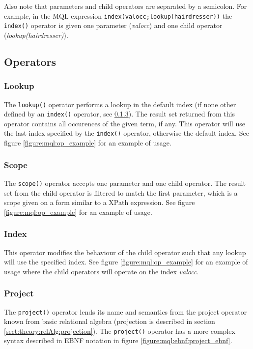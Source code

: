 Also note that parameters and child operators are separated by a semicolon. For
example, in the MQL expression \texttt{index(valocc;lookup(hairdresser))} the
\texttt{index()} operator is given one parameter (\textit{valocc}) and one
child operator (\textit{lookup(hairdresser)}).

\subsection{Operators}
\label{sect:method:marsOperators}
\subsubsection{Lookup}
\label{sect:method:marsOperators:lookup}
The \texttt{lookup()} operator performs a lookup in the default index (if none
other defined by an \texttt{index()} operator, see
\ref{sect:method:marsOperators:index}). The result set returned from this
operator contains all occurences of the given term, if any. This operator will
use the last index specified by the \texttt{index()} operator, otherwise the
default index. See figure \ref{figure:mql:op_example} for an example of usage. 

\subsubsection{Scope}
\label{sect:method:marsOperators:scope}
The \texttt{scope()} operator accepts one parameter and one child operator. The
result set from the child operator is filtered to match the first parameter, which is a
scope given on a form similar to a XPath expression. See figure
\ref{figure:mql:op_example} for an example of usage. 

\subsubsection{Index}
\label{sect:method:marsOperators:index}
This operator modifies the behaviour of the child operator such that any lookup
will use the specified index. See figure \ref{figure:mql:op_example} for an
example of usage where the child operators will operate on the index
\textit{valocc}.

\subsubsection{Project}
\label{sect:method:marsOperators:project}
The \texttt{project()} operator lends its name and semantics from the project
operator known from basic relational algebra (projection is described in
section \ref{sect:theory:relAlg:projection}). The \texttt{project()} operator
has a more complex syntax described in EBNF notation in figure
\ref{figure:mql:ebnf:project_ebnf}.

